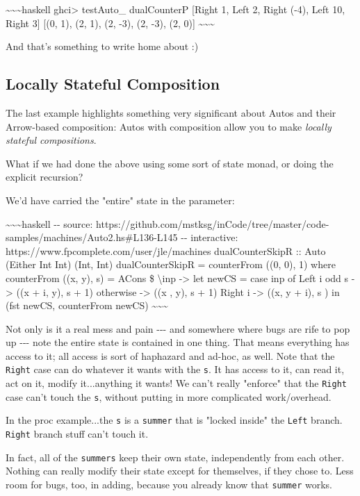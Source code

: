 \documentclass[]{article}
\begin{document}
\textasciitilde{}\textasciitilde{}\textasciitilde{}haskell ghci\textgreater{}
testAuto\_ dualCounterP {[}Right 1, Left 2, Right (-4), Left 10, Right 3{]}
{[}(0, 1), (2, 1), (2, -3), (2, -3), (2, 0){]}
\textasciitilde{}\textasciitilde{}\textasciitilde{}

And that's something to write home about :)

\subsection{Locally Stateful Composition}

The last example highlights something very significant about Autos and their
Arrow-based composition: Autos with composition allow you to make \emph{locally
stateful compositions}.

What if we had done the above using some sort of state monad, or doing the
explicit recursion?

We'd have carried the "entire" state in the parameter:

\textasciitilde{}\textasciitilde{}\textasciitilde{}haskell -\/- source:
https://github.com/mstksg/inCode/tree/master/code-samples/machines/Auto2.hs\#L136-L145
-\/- interactive: https://www.fpcomplete.com/user/jle/machines dualCounterSkipR
:: Auto (Either Int Int) (Int, Int) dualCounterSkipR = counterFrom ((0, 0), 1)
where counterFrom ((x, y), s) = ACons \$ \textbackslash{}inp -\textgreater{} let
newCS = case inp of Left i \textbar{} odd s -\textgreater{} ((x + i, y), s + 1)
\textbar{} otherwise -\textgreater{} ((x , y), s + 1) Right i -\textgreater{}
((x, y + i), s ) in (fst newCS, counterFrom newCS)
\textasciitilde{}\textasciitilde{}\textasciitilde{}

Not only is it a real mess and pain -\/-\/- and somewhere where bugs are rife to
pop up -\/-\/- note the entire state is contained in one thing. That means
everything has access to it; all access is sort of haphazard and ad-hoc, as
well. Note that the \texttt{Right} case can do whatever it wants with the
\texttt{s}. It has access to it, can read it, act on it, modify it...anything it
wants! We can't really "enforce" that the \texttt{Right} case can't touch the
\texttt{s}, without putting in more complicated work/overhead.

In the proc example...the \texttt{s} is a \texttt{summer} that is "locked
inside" the \texttt{Left} branch. \texttt{Right} branch stuff can't touch it.

In fact, all of the \texttt{summers} keep their own state, independently from
each other. Nothing can really modify their state except for themselves, if they
chose to. Less room for bugs, too, in adding, because you already know that
\texttt{summer} works.
\end{document}
